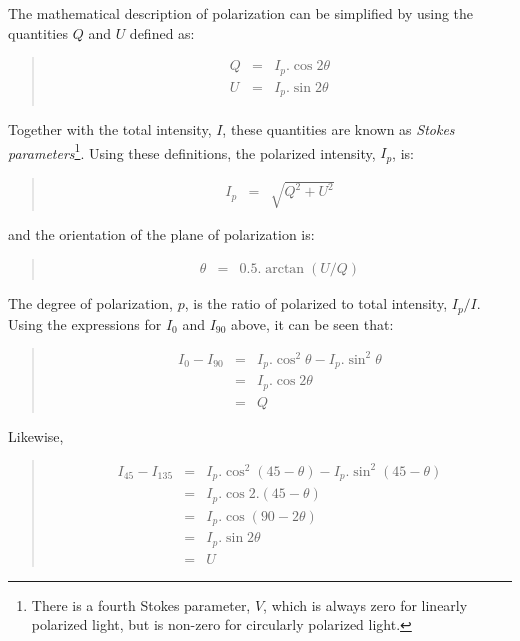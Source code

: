 \documentclass[twoside,11pt]{starlink}
\newenvironment{myquote}{\begin{quote}\begin{small}}{\end{small}\end{quote}}
\begin{document}
The mathematical description of polarization can be simplified by using
the quantities $Q$ and $U$ defined as:
\begin{myquote}
\begin{eqnarray*}
  Q & = & I_{p}.\cos 2\theta \\
  U & = & I_{p}.\sin 2\theta \\
\end{eqnarray*}
\end{myquote}

Together with the total intensity, $I$, these quantities are known as
\emph{Stokes parameters}\footnote{There is a fourth Stokes parameter, $V$, which is
always zero for linearly polarized light, but is non-zero for circularly
polarized light.}. Using these definitions, the polarized intensity, $I_{p}$,
is:
\begin{myquote}
\begin{eqnarray*}
  I_{p} & = & \sqrt{ Q^{2} + U^{2} }
\end{eqnarray*}
\end{myquote}

and the orientation of the plane of polarization is:
\begin{myquote}
\begin{eqnarray*}
  \theta & = & 0.5.\arctan (U/Q)
\end{eqnarray*}
\end{myquote}

The degree of polarization, $p$, is the ratio of polarized to total
intensity, $I_{p}/I$. Using the expressions for $I_{0}$ and $I_{90}$
above, it can be seen that:
\begin{myquote}
\begin{eqnarray*}
  I_{0} - I_{90} & = & I_{p}.\cos^{2}\theta - I_{p}.\sin^{2}\theta \\
                 & = & I_{p}.\cos 2\theta \\
                 & = & Q
\end{eqnarray*}
\end{myquote}

Likewise,
\begin{myquote}
\begin{eqnarray*}
  I_{45} - I_{135} & = & I_{p}.\cos^{2}(45 - \theta) - I_{p}.\sin^{2}(45 - \theta) \\
                   & = & I_{p}.\cos 2.(45 - \theta) \\
                   & = & I_{p}.\cos (90 - 2\theta) \\
                   & = & I_{p}.\sin 2\theta \\
                   & = & U
\end{eqnarray*}
\end{myquote}
\end{document}
